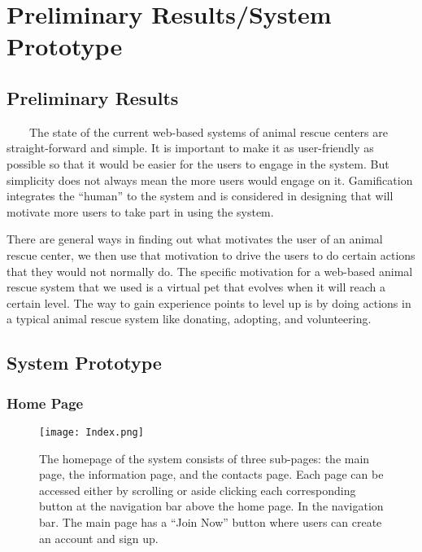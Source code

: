 \chapter{Preliminary Results/System Prototype}
\section{Preliminary Results}
~~~~The state of the current web-based systems of animal rescue centers are straight-forward and simple. It is important to make it as user-friendly as possible so that it would be easier for the users to engage in the system. But simplicity does not always mean the more users would engage on it. Gamification integrates the “human” to the system and is considered in designing that will motivate more users to take part in using the system.

There are general ways in finding out what motivates the user of an animal rescue center, we then use that motivation to drive the users to do certain actions that they would not normally do. The specific motivation for a web-based animal rescue system that we used is a virtual pet that evolves when it will reach a certain level. The way to gain experience points to level up is by doing actions in a typical animal rescue system like donating, adopting, and volunteering. 

\section{System Prototype}

\subsection{Home Page}
\begin{figure}[H]                %
	\centering                    %
	\texttt{[image: Index.png]}      %
	\caption{
		The homepage of the system consists of three sub-pages: the main page, the information page, and the contacts page. Each page can be accessed either by scrolling or aside clicking each corresponding button at the navigation bar above the home page. In the navigation bar. The main page has a “Join Now” button where users can create an account and sign up.}
	\label{fig:Index}
\end{figure}


